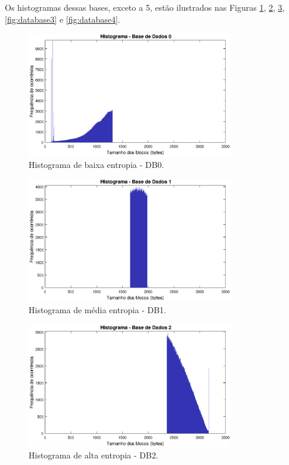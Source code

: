 
Os histogramas dessas bases, exceto a 5, estão ilustrados nas Figuras \ref{fig:database0}, \ref{fig:database1}, \ref{fig:database2}, \ref{fig:database3} e \ref{fig:database4}.

\begin{figure}
\centering
\includegraphics[width=0.8\textwidth]{figuras/hist0.eps}
\caption[Histograma de  baixa entropia -  DB0]{Histograma de baixa entropia - DB0.}
\label{fig:database0}
\end{figure}

\begin{figure}
\centering
\includegraphics[width=0.80\textwidth]{figuras/hist1.eps}
\caption[Histograma de média entropia - DB1]{Histograma de média entropia - DB1.}
\label{fig:database1}
\end{figure}

\begin{figure}
\centering
\includegraphics[width=0.8\textwidth]{figuras/hist2.eps}
\caption[Histograma de alta entropia - DB2]{ Histograma de alta entropia - DB2.}
\label{fig:database2}
\end{figure}


